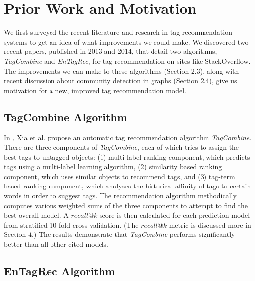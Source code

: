 \documentclass[11pt]{IEEEtran}
\begin{document}
\section{Prior Work and Motivation}

We first surveyed the recent literature and research in tag recommendation systems to get an idea of what improvements we could make. We discovered two recent papers, published in 2013 and 2014, that detail two algorithms, \textit{TagCombine} and \textit{EnTagRec}, for tag recommendation on sites like StackOverflow. The improvements we can make to these algorithms (Section 2.3), along with recent discussion about community detection in graphs (Section 2.4), give us motivation for a new, improved tag recommendation model.

\subsection{TagCombine Algorithm}

In \cite{1}, Xia et al. propose an automatic tag recommendation algorithm \textit{TagCombine}. There are three components of \textit{TagCombine}, each of which tries to assign the best tags to untagged objects: (1) multi-label ranking component, which predicts tags using a multi-label learning algorithm, (2) similarity based ranking component, which uses similar objects to recommend tags, and (3) tag-term based ranking component, which analyzes the historical affinity of tags to certain words in order to suggest tags. The recommendation algorithm methodically computes various weighted sums of the three components to attempt to find the best overall model. A $recall@k$ score is then calculated for each prediction model from stratified $10$-fold cross validation. (The $recall@k$ metric is discussed more in Section $4$.) The results demonstrate that \textit{TagCombine} performs significantly better than all other cited models.

\subsection{EnTagRec Algorithm}
\end{document}
